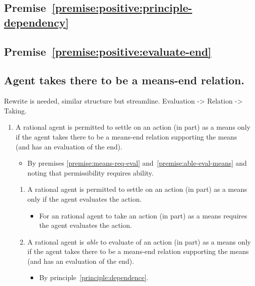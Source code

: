 \documentclass[10pt]{article}
\newcommand{\hozlinedash}[0]{%
  \noindent\hdashrule[0.5ex][c]{\textwidth}{.1pt}{2.5pt}
}
\begin{document}
\subsection{Premise~\ref{premise:positive:principle-dependency}}
\label{sec:premise-2}


\subsection{Premise~\ref{premise:positive:evaluate-end}}
\label{sec:premise-3}






\subsection{Agent takes there to be a means-end relation.}
\label{sec:means-end-relation}



{\color{red} Rewrite is needed, similar structure but streamline.
Evaluation -> Relation -> Taking.}

\hozlinedash

\begin{enumerate}[label=P\arabic*., ref=(P\arabic*)]
\item A rational agent is permitted to settle on an action (in part) as a means only if the agent takes there to be a means-end relation supporting the means (and has an evaluation of the end).
  \begin{itemize}
  \item By premises \ref{premise:means-req-eval} and~\ref{premise:able-eval-means} and noting that permissibility requires ability.
  \end{itemize}
  \begin{enumerate}[label=P\arabic{enumi}\alph*., ref=(P\arabic{enumi}\alph*)]
  \item A rational agent is permitted to settle on an action (in part) as a means only if the agent evaluates the action.
    \begin{itemize}
    \item For an rational agent to take an action (in part) as a means requires the agent evaluates the action.
    \end{itemize}
  \item A rational agent is \emph{able} to evaluate of an action (in part) as a means only if the agent takes there to be a means-end relation supporting the means (and has an evaluation of the end).
    \begin{itemize}
    \item By principle~\ref{principle:dependence}.
    \end{itemize}
  \end{enumerate}
\end{enumerate}
\end{document}
